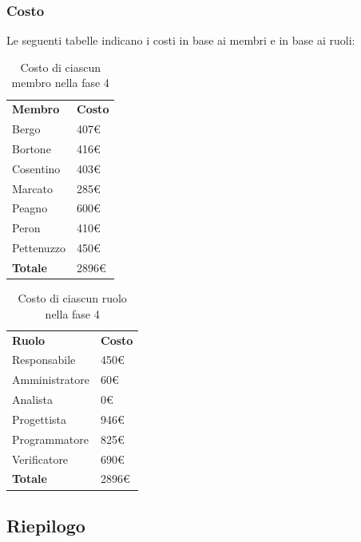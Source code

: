 	\subsubsection{Costo}
		Le seguenti tabelle indicano i costi in base ai membri e in base ai ruoli:
		\begin{table}[H]
			\centering
			\begin{tabular}{| l | l |}
				\rowcolor{LightBlue}
				\textbf{\color{white}Membro}
				& \textbf{\color{white}Costo}\\
				
				Bergo				& 407€\\
				Bortone			& 416€\\
				Cosentino		& 403€\\
				Marcato			& 285€\\
				Peagno				& 600€\\
				Peron				& 410€\\
				Pettenuzzo		& 450€\\ \hline
				\textbf{Totale} & 2896€\\ \hline
			\end{tabular}
			\caption{Costo di ciascun membro nella fase 4}
		\end{table}
		
		\begin{table}[H]
			\centering
			\begin{tabular}{| l | l |}
				\rowcolor{LightBlue}
				\textbf{\color{white}Ruolo}
				& \textbf{\color{white}Costo}\\
				
				Responsabile 		& 450€\\
				Amministratore 	& 60€\\
				Analista 				& 0€\\			
				Progettista 			& 946€\\
				Programmatore 		& 825€\\
				Verificatore 		& 690€\\ \hline
				\textbf{Totale} 	& 2896€\\ \hline
			\end{tabular}		
			\caption{Costo di ciascun ruolo nella fase 4}
		\end{table}

\subsection{Riepilogo}

